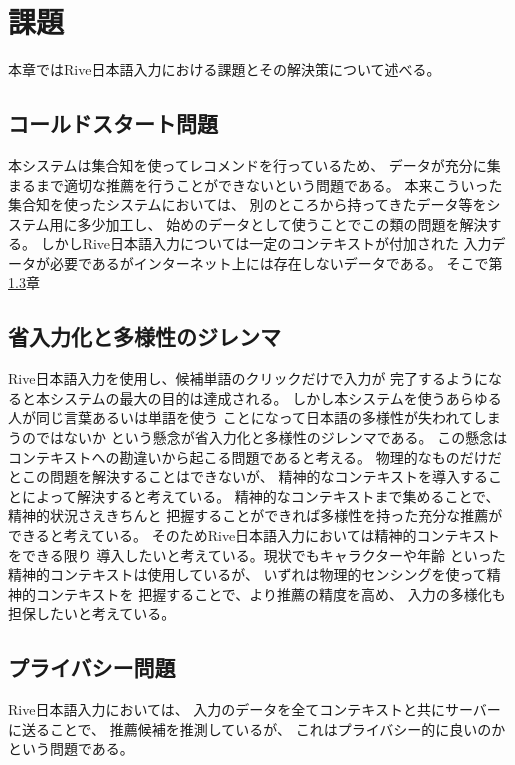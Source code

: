 \chapter{課題}
\label{chap:discussion}
本章ではRive日本語入力における課題とその解決策について述べる。

\newpage
\section{コールドスタート問題}
本システムは集合知を使ってレコメンドを行っているため、
データが充分に集まるまで適切な推薦を行うことができないという問題である。
本来こういった集合知を使ったシステムにおいては、
別のところから持ってきたデータ等をシステム用に多少加工し、
始めのデータとして使うことでこの類の問題を解決する。
しかしRive日本語入力については一定のコンテキストが付加された
入力データが必要であるがインターネット上には存在しないデータである。
そこで第\ref{}章

\section{省入力化と多様性のジレンマ}
Rive日本語入力を使用し、候補単語のクリックだけで入力が
完了するようになると本システムの最大の目的は達成される。
しかし本システムを使うあらゆる人が同じ言葉あるいは単語を使う
ことになって日本語の多様性が失われてしまうのではないか
という懸念が省入力化と多様性のジレンマである。
この懸念はコンテキストへの勘違いから起こる問題であると考える。
物理的なものだけだとこの問題を解決することはできないが、
精神的なコンテキストを導入することによって解決すると考えている。
精神的なコンテキストまで集めることで、精神的状況さえきちんと
把握することができれば多様性を持った充分な推薦ができると考えている。
そのためRive日本語入力においては精神的コンテキストをできる限り
導入したいと考えている。現状でもキャラクターや年齢
といった精神的コンテキストは使用しているが、
いずれは物理的センシングを使って精神的コンテキストを
把握することで、より推薦の精度を高め、
入力の多様化も担保したいと考えている。

\section{プライバシー問題}
Rive日本語入力においては、
入力のデータを全てコンテキストと共にサーバーに送ることで、
推薦候補を推測しているが、
これはプライバシー的に良いのかという問題である。

